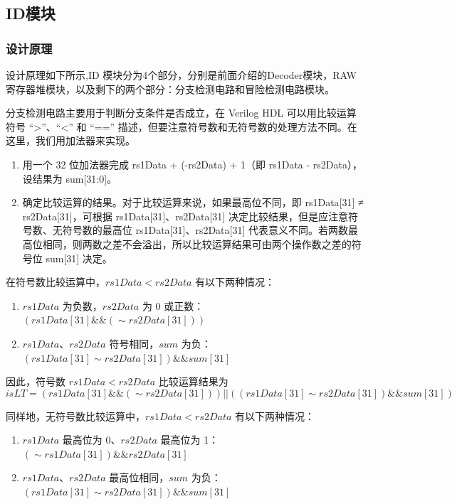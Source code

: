 \documentclass[12pt,hyperref,a4paper,UTF8]{ctexart}
\begin{document}


\subsection{ID模块}
\subsubsection*{\Large 设计原理}
\normalsize
  设计原理如下所示,ID 模块分为4个部分，分别是前面介绍的Decoder模块，RAW寄存器堆模块，以及剩下的两个部分：分支检测电路和冒险检测电路模块。

  分支检测电路主要用于判断分支条件是否成立，在 Verilog HDL 可以用比较运算符号 “>”、“<” 和 “==” 描述，但要注意符号数和无符号数的处理方法不同。在这里，我们用加法器来实现。

\begin{enumerate}
    \item 用一个 32 位加法器完成 rs1Data + (-rs2Data) + 1（即 rs1Data - rs2Data），设结果为 sum[31:0]。
    \item 确定比较运算的结果。对于比较运算来说，如果最高位不同，即 rs1Data[31] ≠ rs2Data[31]，可根据 rs1Data[31]、rs2Data[31] 决定比较结果，但是应注意符号数、无符号数的最高位 rs1Data[31]、rs2Data[31] 代表意义不同。若两数最高位相同，则两数之差不会溢出，所以比较运算结果可由两个操作数之差的符号位 sum[31] 决定。
\end{enumerate}

在符号数比较运算中，$rs1Data < rs2Data$ 有以下两种情况：

\begin{enumerate}
    \item $rs1Data$ 为负数，$rs2Data$ 为 0 或正数：$(rs1Data[31] \& \& (\sim rs2Data[31]))$
    \item $rs1Data$、$rs2Data$ 符号相同，$sum$ 为负：$(rs1Data[31] \sim rs2Data[31]) \&\& sum[31]$
\end{enumerate}

因此，符号数 $rs1Data < rs2Data$ 比较运算结果为
\begin{equation}
isLT = (rs1Data[31] \& \& (\sim rs2Data[31])) || ((rs1Data[31] \sim rs2Data[31]) \&\& sum[31]) 
\end{equation}

同样地，无符号数比较运算中，$rs1Data < rs2Data$ 有以下两种情况：

\begin{enumerate}
    \item $rs1Data$ 最高位为 0、$rs2Data$ 最高位为 1：$(\sim rs1Data[31]) \&\& rs2Data[31]$
    \item $rs1Data$、$rs2Data$ 最高位相同，$sum$ 为负：$(rs1Data[31] \sim rs2Data[31]) \&\& sum[31]$
\end{enumerate}
\end{document}
